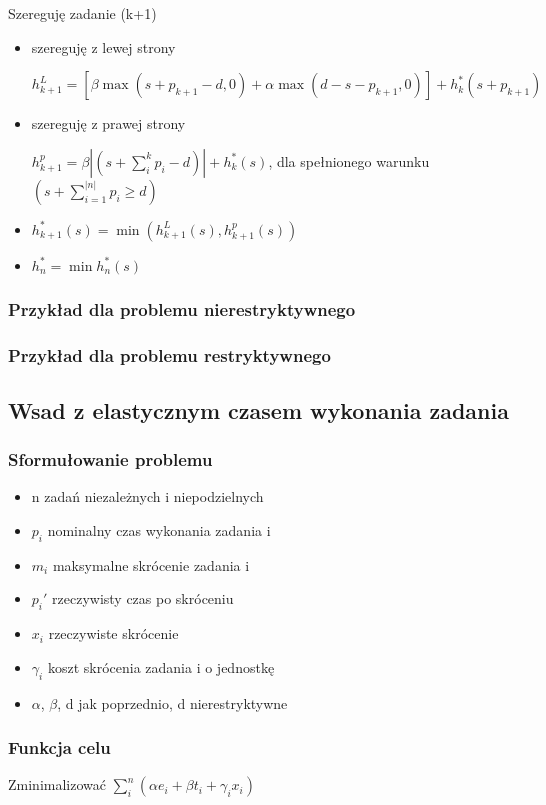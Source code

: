 \documentclass[12pt,a4paper]{article}
\begin{document}
Szereguję zadanie (k+1)
\begin{itemize}
	\item szereguję z lewej strony
	
	$h_{k+1}^{L}=[\beta\max(s+p_{k+1}-d,0) + \alpha\max(d-s-p_{k+1},0)]+h_{k}^{*}(s+p_{k+1})$
	\item szereguję z prawej strony
	
	$h_{k+1}^{p}=\beta\left | (s+\sum\limits_{i}^{k}p_{i}-d) \right | +h_{k}^{*}(s)$, dla spełnionego warunku $(s+\sum\limits_{i=1}^{|n|}p_{i}\geq d)$
	\item $h_{k+1}^{*}(s)=\min(h_{k+1}^{L}(s), h_{k+1}^{p}(s))$
	\item $h_{n}^{*}=\min h_{n}^{*}(s)$
\end{itemize}
\subsubsection{Przykład dla problemu nierestryktywnego}
\subsubsection{Przykład dla problemu restryktywnego}

\subsection{Wsad z elastycznym czasem wykonania zadania}
\subsubsection{Sformułowanie problemu}
\begin{itemize}
\item n zadań niezależnych i niepodzielnych
\item $p_{i}$ nominalny czas wykonania zadania i
\item $m_{i}$ maksymalne skrócenie zadania i
\item $p_{i}'$ rzeczywisty czas po skróceniu
\item $x_{i}$ rzeczywiste skrócenie
\item $\gamma_{i}$ koszt skrócenia zadania i o jednostkę
\item $\alpha$, $\beta$, d jak poprzednio, d nierestryktywne
\end{itemize}
\subsubsection{Funkcja celu}
Zminimalizować $\sum\limits_{i}^{n}(\alpha e_{i}+\beta t_{i} + \gamma_{i}x_{i})$
\end{document}
